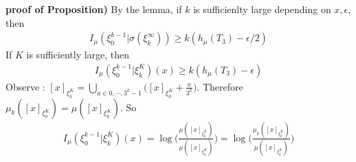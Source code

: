 \documentclass[12pt,a4paper]{report}
\newenvironment{proof}
{\begin{changemargin}{1cm}{0.5cm} 
	}%
	{\end{changemargin}
}
\begin{document}
\s

\begin{proof}
\textbf{proof of Proposition)} By the lemma, if $k$ is sufficienlty large depending on $x,\epsilon$, then
\begin{align*}
I_{\mu} (\xi_0^{k-1} | \sigma(\xi_k^{\infty})) \geq k(h_{\mu}(T_3) - \epsilon/2)
\end{align*}
If $K$ is sufficiently large, then
\begin{align*}
I_{\mu}(\xi_0^{k-1}| \xi_k^K)(x) \geq k (h_{\mu}(T_3) - \epsilon)
\end{align*}
Observe : $[x]_{\xi_k^K} = \bigcup_{a\in 0, \cdots, 3^k-1} \Big( [x]_{\xi_0^K} + \frac{a}{3^k} \Big)$. Therefore $\mu_{k}([x]_{\xi_0^K}) = \mu([x]_{\xi_k^K})$. So
\begin{align*}
I_{\mu}(\xi_0^{k-1}| \xi_k^K)(x) = \log \Big( \frac{\mu([x]_{\xi_k^K})}{\mu([x]_{\xi_0^K})} \Big) = \log\Big( \frac{\mu_k([x]_{\xi_0^K})}{\mu([x]_{\xi_0^K})} \Big)
\end{align*}

\eop
\end{proof}
\s
\end{document}
